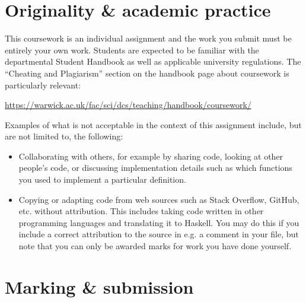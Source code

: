
\section{Originality \& academic practice}

This coursework is an individual assignment and the work you submit must be entirely your own work. Students are expected to be familiar with the departmental Student Handbook as well as applicable university regulations. The ``Cheating and Plagiarism'' section on the handbook page about coursework is particularly relevant:
\begin{center}\small
	\url{https://warwick.ac.uk/fac/sci/dcs/teaching/handbook/coursework/}
\end{center}
Examples of what is not acceptable in the context of this assignment include, but are not limited to, the following:
\begin{itemize}
	\item Collaborating with others, for example by sharing code, looking at other people's code, or discussing implementation details such as which functions you used to implement a particular definition. 
	
	\item Copying or adapting code from web sources such as Stack Overflow, GitHub, etc. without attribution. This includes taking code written in other programming languages and translating it to Haskell. You may do this if you include a correct attribution to the source in e.g. a comment in your file, but note that you can only be awarded marks for work you have done yourself. 
\end{itemize}

\section{Marking \& submission}

